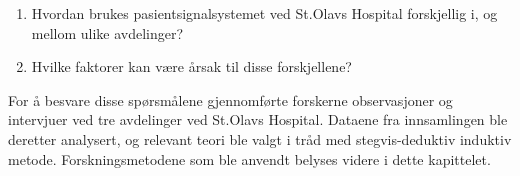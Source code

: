 \begin{enumerate}
\item Hvordan brukes pasientsignalsystemet ved St.Olavs Hospital forskjellig i, og mellom ulike avdelinger? 
\item Hvilke faktorer kan være årsak til disse forskjellene?
\end{enumerate}

\noindent
For å besvare disse spørsmålene gjennomførte forskerne observasjoner og intervjuer ved tre avdelinger ved St.Olavs Hospital. Dataene fra innsamlingen ble deretter analysert, og relevant teori ble valgt i tråd med stegvis-deduktiv induktiv metode. Forskningsmetodene som ble anvendt belyses videre i dette kapittelet.